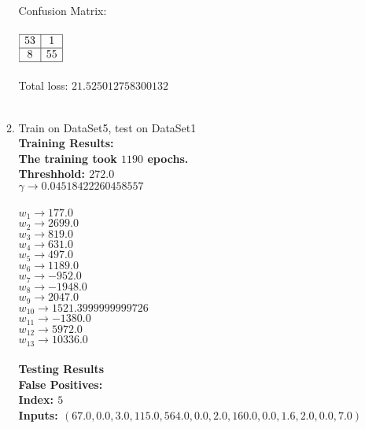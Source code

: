 \begin{enumerate}
\begin{enumerate}
					\textnormal{Confusion Matrix: } \\ \\
					\( 
						\begin{array}{|c|c|}
							\hline
							53 & 1 \\
							\hline							
							8 & 55 \\
							\hline
						\end{array}
					\) \\ \\
					Total loss: \(21.525012758300132\) \\ \\
				\item{Train on DataSet5, test on DataSet1} \\
					\bf{Training Results: } \\
						\textnormal{The training took } \(1190\) \textnormal{ epochs. } \\
						\textnormal{Threshhold:} \( 272.0 \) \\
						\( \gamma \rightarrow 0.04518422260458557 \) \\ \\
						\( w_{1} \rightarrow 177.0 \) \\
						\( w_{2} \rightarrow 2699.0 \) \\
						\( w_{3} \rightarrow 819.0 \) \\
						\( w_{4} \rightarrow 631.0 \) \\
						\( w_{5} \rightarrow 497.0 \) \\
						\( w_{6} \rightarrow 1189.0 \) \\
						\( w_{7} \rightarrow -952.0 \) \\
						\( w_{8} \rightarrow -1948.0 \) \\
						\( w_{9} \rightarrow 2047.0 \) \\
						\( w_{10} \rightarrow 1521.3999999999726 \) \\
						\( w_{11} \rightarrow -1380.0 \) \\
						\( w_{12} \rightarrow 5972.0 \) \\
						\( w_{13} \rightarrow 10336.0 \) \\ \\
					\bf{Testing Results} \\
					\textnormal{False Positives: } \\
					\textnormal{Index: } \( 5 \) \\
					\textnormal{Inputs: } \( (67.0, 0.0, 3.0, 115.0, 564.0, 0.0, 2.0, 160.0, 0.0, 1.6, 2.0, 0.0, 7.0) \) \\

\end{enumerate}
\end{enumerate}

